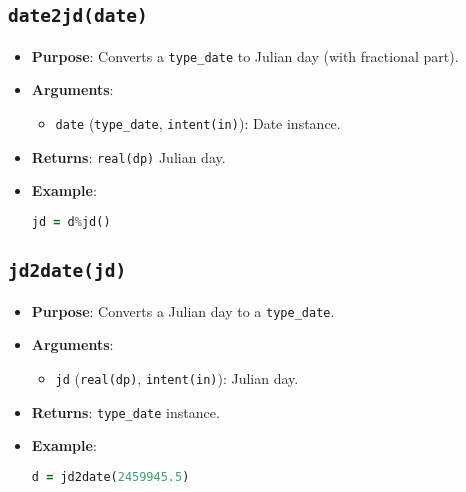 \documentclass[12pt,a4paper]{report}
\begin{document}
\subsection{\texttt{date2jd(date)}}
\begin{itemize}
\item \textbf{Purpose}: Converts a \texttt{type\_date} to Julian day (with fractional part).
\item \textbf{Arguments}:
\begin{itemize}
\item \texttt{date} (\texttt{type\_date}, \texttt{intent(in)}): Date instance.
\end{itemize}
\item \textbf{Returns}: \texttt{real(dp)} Julian day.
\item \textbf{Example}:
\begin{lstlisting}[language=Fortran]
jd = d%jd()
\end{lstlisting}
\end{itemize}

\subsection{\texttt{jd2date(jd)}}
\begin{itemize}
\item \textbf{Purpose}: Converts a Julian day to a \texttt{type\_date}.
\item \textbf{Arguments}:
\begin{itemize}
\item \texttt{jd} (\texttt{real(dp)}, \texttt{intent(in)}): Julian day.
\end{itemize}
\item \textbf{Returns}: \texttt{type\_date} instance.
\item \textbf{Example}:
\begin{lstlisting}[language=Fortran]
d = jd2date(2459945.5)
\end{lstlisting}
\end{itemize}
\end{document}

